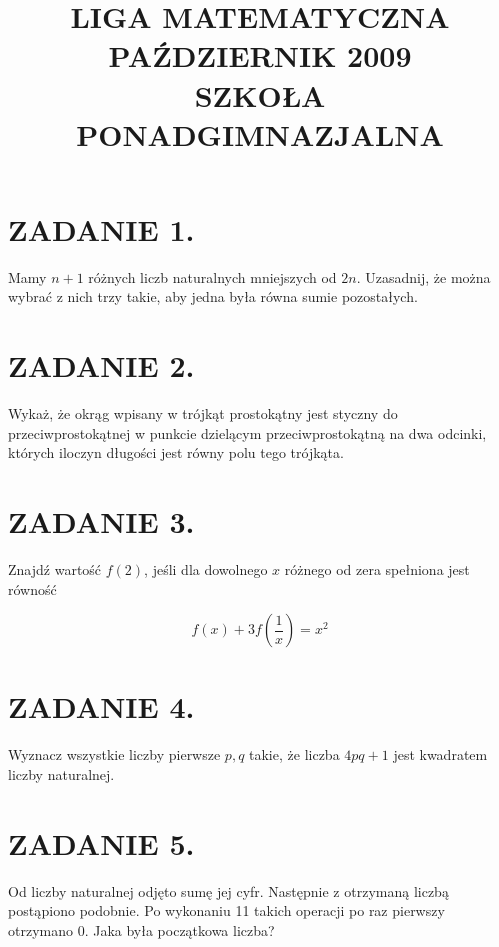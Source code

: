 \documentclass[10pt]{article}
\title{LIGA MATEMATYCZNA \\
 PAŹDZIERNIK 2009 \\
 SZKOŁA PONADGIMNAZJALNA }
\author{}
\date{}
\begin{document}
\maketitle
\section*{ZADANIE 1.}
Mamy \(n+1\) różnych liczb naturalnych mniejszych od \(2 n\). Uzasadnij, że można wybrać z nich trzy takie, aby jedna była równa sumie pozostałych.

\section*{ZADANIE 2.}
Wykaż, że okrąg wpisany w trójkąt prostokątny jest styczny do przeciwprostokątnej w punkcie dzielącym przeciwprostokątną na dwa odcinki, których iloczyn długości jest równy polu tego trójkąta.

\section*{ZADANIE 3.}
Znajdź wartość \(f(2)\), jeśli dla dowolnego \(x\) różnego od zera spełniona jest równość

\[
f(x)+3 f\left(\frac{1}{x}\right)=x^{2}
\]

\section*{ZADANIE 4.}
Wyznacz wszystkie liczby pierwsze \(p, q\) takie, że liczba \(4 p q+1\) jest kwadratem liczby naturalnej.

\section*{ZADANIE 5.}
Od liczby naturalnej odjęto sumę jej cyfr. Następnie z otrzymaną liczbą postąpiono podobnie. Po wykonaniu 11 takich operacji po raz pierwszy otrzymano 0. Jaka była początkowa liczba?
\end{document}
